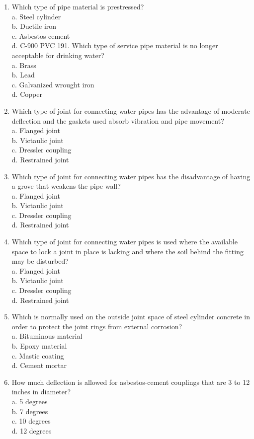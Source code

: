 \documentclass[10pt]{article}
\begin{document}
\begin{enumerate}
  \item Which type of pipe material is prestressed?\\
a. Steel cylinder\\
b. Ductile iron\\
c. Asbestos-cement\\
d. C-900 PVC 191. Which type of service pipe material is no longer acceptable for drinking water?\\
a. Brass\\
b. Lead\\
c. Galvanized wrought iron\\
d. Copper

  \item Which type of joint for connecting water pipes has the advantage of moderate deflection and the gaskets used absorb vibration and pipe movement?\\
a. Flanged joint\\
b. Victaulic joint\\
c. Dressler coupling\\
d. Restrained joint

  \item Which type of joint for connecting water pipes has the disadvantage of having a grove that weakens the pipe wall?\\
a. Flanged joint\\
b. Victaulic joint\\
c. Dressler coupling\\
d. Restrained joint

  \item Which type of joint for connecting water pipes is used where the available space to lock a joint in place is lacking and where the soil behind the fitting may be disturbed?\\
a. Flanged joint\\
b. Victaulic joint\\
c. Dressler coupling\\
d. Restrained joint

  \item Which is normally used on the outside joint space of steel cylinder concrete in order to protect the joint rings from external corrosion?\\
a. Bituminous material\\
b. Epoxy material\\
c. Mastic coating\\
d. Cement mortar

  \item How much deflection is allowed for asbestos-cement couplings that are 3 to 12 inches in diameter?\\
a. 5 degrees\\
b. 7 degrees\\
c. 10 degrees\\
d. 12 degrees


\end{enumerate}
\end{document}
